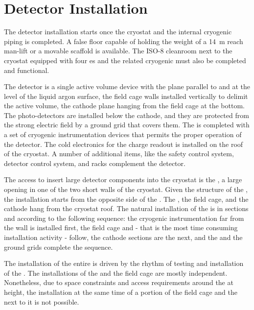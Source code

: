 \section{Detector Installation}
\label{ch:dp-tc-installation}

The detector installation starts once the cryostat and the internal cryogenic piping is completed.
A false floor capable of holding the weight of a 14~m reach man-lift or a movable scaffold is available.
The ISO-8 cleanroom next to the cryostat equipped with four  \coldbox{}es and the related cryogenic must also be completed and functional.

The  detector is a single active volume device with the  plane parallel to and at the level of the liquid argon surface, the field cage walls installed vertically to delimit the active volume, the cathode plane hanging from the field cage at the bottom.
The photo-detectors are installed below the cathode, and they are protected from the strong electric field by a ground grid that covers them.
The  is completed with a set of cryogenic instrumentation devices that permits the proper operation of the detector.
The cold electronics for the charge readout is installed on the roof of the cryostat.
A number of additional items, like the safety control system, detector control system, and  racks complement the detector.

The access to insert large detector components into the cryostat is the , a large opening in one of the two short walls of the cryostat.
Given the structure of the , the installation starts from the opposite side of the .
The , the field cage, and the cathode hang from the cryostat roof.
The natural installation of the  is in sections and according to the following sequence: the cryogenic instrumentation far from the  wall is installed first,
the field cage and  - that is the most time consuming installation activity - follow, the cathode sections are the next, and the  and the ground grids complete the sequence.

The installation of the entire  is driven by the rhythm of testing and installation of the .
The installations of the  and the field cage are mostly independent.
Nonetheless, due to space constraints and access requirements around the  at height, the installation at the same time of a portion of the field cage and the  next to it is not possible.

